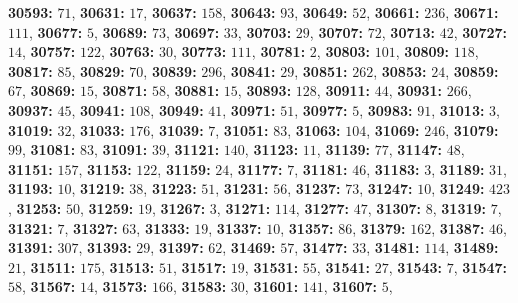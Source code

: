 \textsf{\bfseries 30593:} $71$, \textsf{\bfseries 30631:} $17$, \textsf{\bfseries 30637:} $158$, \textsf{\bfseries 30643:} $93$, \textsf{\bfseries 30649:} $52$, \textsf{\bfseries 30661:} $236$, \textsf{\bfseries 30671:} $111$, \textsf{\bfseries 30677:} $5$, \textsf{\bfseries 30689:} $73$, \textsf{\bfseries 30697:} $33$, \textsf{\bfseries 30703:} $29$, \textsf{\bfseries 30707:} $72$, \textsf{\bfseries 30713:} $42$, \textsf{\bfseries 30727:} $14$, \textsf{\bfseries 30757:} $122$, \textsf{\bfseries 30763:} $30$, \textsf{\bfseries 30773:} $111$, \textsf{\bfseries 30781:} $2$, \textsf{\bfseries 30803:} $101$, \textsf{\bfseries 30809:} $118$, \textsf{\bfseries 30817:} $85$, \textsf{\bfseries 30829:} $70$, \textsf{\bfseries 30839:} $296$, \textsf{\bfseries 30841:} $29$, \textsf{\bfseries 30851:} $262$, \textsf{\bfseries 30853:} $24$, \textsf{\bfseries 30859:} $67$, \textsf{\bfseries 30869:} $15$, \textsf{\bfseries 30871:} $58$, \textsf{\bfseries 30881:} $15$, \textsf{\bfseries 30893:} $128$, \textsf{\bfseries 30911:} $44$, \textsf{\bfseries 30931:} $266$, \textsf{\bfseries 30937:} $45$, \textsf{\bfseries 30941:} $108$, \textsf{\bfseries 30949:} $41$, \textsf{\bfseries 30971:} $51$, \textsf{\bfseries 30977:} $5$, \textsf{\bfseries 30983:} $91$, \textsf{\bfseries 31013:} $3$, \textsf{\bfseries 31019:} $32$, \textsf{\bfseries 31033:} $176$, \textsf{\bfseries 31039:} $7$, \textsf{\bfseries 31051:} $83$, \textsf{\bfseries 31063:} $104$, \textsf{\bfseries 31069:} $246$, \textsf{\bfseries 31079:} $99$, \textsf{\bfseries 31081:} $83$, \textsf{\bfseries 31091:} $39$, \textsf{\bfseries 31121:} $140$, \textsf{\bfseries 31123:} $11$, \textsf{\bfseries 31139:} $77$, \textsf{\bfseries 31147:} $48$, \textsf{\bfseries 31151:} $157$, \textsf{\bfseries 31153:} $122$, \textsf{\bfseries 31159:} $24$, \textsf{\bfseries 31177:} $7$, \textsf{\bfseries 31181:} $46$, \textsf{\bfseries 31183:} $3$, \textsf{\bfseries 31189:} $31$, \textsf{\bfseries 31193:} $10$, \textsf{\bfseries 31219:} $38$, \textsf{\bfseries 31223:} $51$, \textsf{\bfseries 31231:} $56$, \textsf{\bfseries 31237:} $73$, \textsf{\bfseries 31247:} $10$, \textsf{\bfseries 31249:} $423$, \textsf{\bfseries 31253:} $50$, \textsf{\bfseries 31259:} $19$, \textsf{\bfseries 31267:} $3$, \textsf{\bfseries 31271:} $114$, \textsf{\bfseries 31277:} $47$, \textsf{\bfseries 31307:} $8$, \textsf{\bfseries 31319:} $7$, \textsf{\bfseries 31321:} $7$, \textsf{\bfseries 31327:} $63$, \textsf{\bfseries 31333:} $19$, \textsf{\bfseries 31337:} $10$, \textsf{\bfseries 31357:} $86$, \textsf{\bfseries 31379:} $162$, \textsf{\bfseries 31387:} $46$, \textsf{\bfseries 31391:} $307$, \textsf{\bfseries 31393:} $29$, \textsf{\bfseries 31397:} $62$, \textsf{\bfseries 31469:} $57$, \textsf{\bfseries 31477:} $33$, \textsf{\bfseries 31481:} $114$, \textsf{\bfseries 31489:} $21$, \textsf{\bfseries 31511:} $175$, \textsf{\bfseries 31513:} $51$, \textsf{\bfseries 31517:} $19$, \textsf{\bfseries 31531:} $55$, \textsf{\bfseries 31541:} $27$, \textsf{\bfseries 31543:} $7$, \textsf{\bfseries 31547:} $58$, \textsf{\bfseries 31567:} $14$, \textsf{\bfseries 31573:} $166$, \textsf{\bfseries 31583:} $30$, \textsf{\bfseries 31601:} $141$, \textsf{\bfseries 31607:} $5$, 
